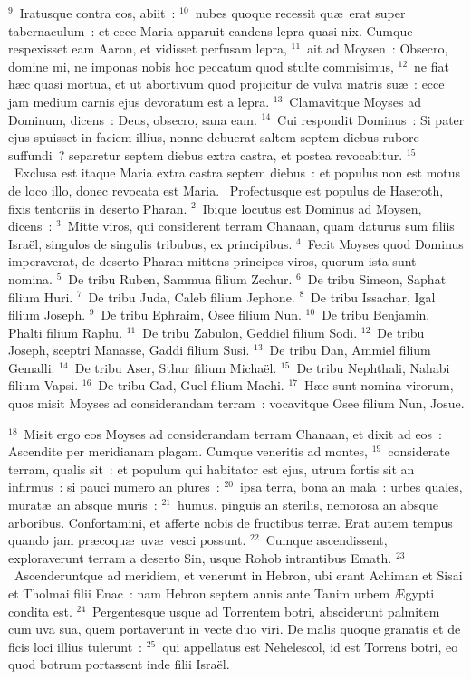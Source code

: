 ${}^{9}$~Iratusque contra eos, abiit~:
${}^{10}$~nubes quoque recessit qu\ae\ erat super tabernaculum~: et ecce Maria apparuit candens lepra quasi nix. Cumque respexisset eam Aaron, et vidisset perfusam lepra,
${}^{11}$~ait ad Moysen~: Obsecro, domine mi, ne imponas nobis hoc peccatum quod stulte commisimus,
${}^{12}$~ne fiat h\ae c quasi mortua, et ut abortivum quod projicitur de vulva matris su\ae~: ecce jam medium carnis ejus devoratum est a lepra.
${}^{13}$~Clamavitque Moyses ad Dominum, dicens~: Deus, obsecro, sana eam.
${}^{14}$~Cui respondit Dominus~: Si pater ejus spuisset in faciem illius, nonne debuerat saltem septem diebus rubore suffundi~? separetur septem diebus extra castra, et postea revocabitur.
${}^{15}$~Exclusa est itaque Maria extra castra septem diebus~: et populus non est motus de loco illo, donec revocata est Maria.
~Profectusque est populus de Haseroth, fixis tentoriis in deserto Pharan.
${}^{2}$~Ibique locutus est Dominus ad Moysen, dicens~:
${}^{3}$~Mitte viros, qui considerent terram Chanaan, quam daturus sum filiis Isra\"el, singulos de singulis tribubus, ex principibus.
${}^{4}$~Fecit Moyses quod Dominus imperaverat, de deserto Pharan mittens principes viros, quorum ista sunt nomina.
${}^{5}$~De tribu Ruben, Sammua filium Zechur.
${}^{6}$~De tribu Simeon, Saphat filium Huri.
${}^{7}$~De tribu Juda, Caleb filium Jephone.
${}^{8}$~De tribu Issachar, Igal filium Joseph.
${}^{9}$~De tribu Ephraim, Osee filium Nun.
${}^{10}$~De tribu Benjamin, Phalti filium Raphu.
${}^{11}$~De tribu Zabulon, Geddiel filium Sodi.
${}^{12}$~De tribu Joseph, sceptri Manasse, Gaddi filium Susi.
${}^{13}$~De tribu Dan, Ammiel filium Gemalli.
${}^{14}$~De tribu Aser, Sthur filium Micha\"el.
${}^{15}$~De tribu Nephthali, Nahabi filium Vapsi.
${}^{16}$~De tribu Gad, Guel filium Machi.
${}^{17}$~H\ae c sunt nomina virorum, quos misit Moyses ad considerandam terram~: vocavitque Osee filium Nun, Josue.


${}^{18}$~Misit ergo eos Moyses ad considerandam terram Chanaan, et dixit ad eos~: Ascendite per meridianam plagam. Cumque veneritis ad montes,
${}^{19}$~considerate terram, qualis sit~: et populum qui habitator est ejus, utrum fortis sit an infirmus~: si pauci numero an plures~:
${}^{20}$~ipsa terra, bona an mala~: urbes quales, murat\ae\ an absque muris~:
${}^{21}$~humus, pinguis an sterilis, nemorosa an absque arboribus. Confortamini, et afferte nobis de fructibus terr\ae . Erat autem tempus quando jam pr\ae coqu\ae\ uv\ae\ vesci possunt.
${}^{22}$~Cumque ascendissent, exploraverunt terram a deserto Sin, usque Rohob intrantibus Emath.
${}^{23}$~Ascenderuntque ad meridiem, et venerunt in Hebron, ubi erant Achiman et Sisai et Tholmai filii Enac~: nam Hebron septem annis ante Tanim urbem \AE gypti condita est.
${}^{24}$~Pergentesque usque ad Torrentem botri, absciderunt palmitem cum uva sua, quem portaverunt in vecte duo viri. De malis quoque granatis et de ficis loci illius tulerunt~:
${}^{25}$~qui appellatus est Nehelescol, id est Torrens botri, eo quod botrum portassent inde filii Isra\"el.


